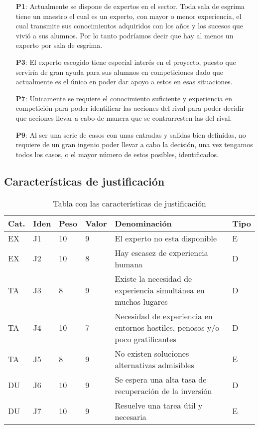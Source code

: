 \begin{enumerate}
  \item[\textbf{P1}:] Actualmente se dispone de expertos en el sector. Toda sala de esgrima
     tiene un maestro el cual es un experto, con mayor o menor experiencia, el cual transmite
     sus conocimientos adquiridos con los años y los sucesos que vivió a sus alumnos. Por lo tanto
     podríamos decir que hay al menos un experto por sala de esgrima.
  \item[\textbf{P3}:] El experto escogido tiene especial interés en el proyecto, puesto que
     serviría de gran ayuda para sus alumnos en competiciones dado que actualmente es el único
     en poder dar apoyo a estos en esas situaciones.
  \item[\textbf{P7}:] Unicamente se requiere el conocimiento suficiente y experiencia en competición
     para poder identificar las acciones del rival para poder decidir que acciones llevar a cabo
     de manera que se contrarresten las del rival.
  \item[\textbf{P9}:] Al ser una serie de casos con unas entradas y salidas bien definidas, no requiere
     de un gran ingenio poder llevar a cabo la decisión, una vez tengamos todos los casos, o el mayor
     número de estos posibles, identificados.
\end{enumerate}


\subsection{Características de justificación}
\begin{table}[htb]%
  \centering
  \caption{Tabla con las características de justificación}
  \label{tab:anchura}
  \begin{tabular}{ | l | l | l | l | p{8cm} | l | }
    \hline
    Cat. & Iden & Peso & Valor & Denominación & Tipo \\ \hline
    EX & J1 & 10 & 9 & El experto no esta disponible & E \\ \hline
    EX & J2 & 10 & 8 & Hay escasez de experiencia humana & D \\ \hline
    TA & J3 & 8 & 9 & Existe la necesidad de experiencia simultánea en muchos lugares & D \\ \hline
    TA & J4 & 10 & 7 & Necesidad de experiencia en entornos hostiles, penosos y/o poco gratificantes & D \\ \hline
    TA & J5 & 8 & 9 & No existen soluciones alternativas admisibles & E \\ \hline
    DU & J6 & 10 & 9 & Se espera una alta tasa de recuperación de la inversión & D \\ \hline
    DU & J7 & 10 & 9 & Resuelve una tarea útil y necesaria & E \\ \hline
   \end{tabular}
\end{table}

